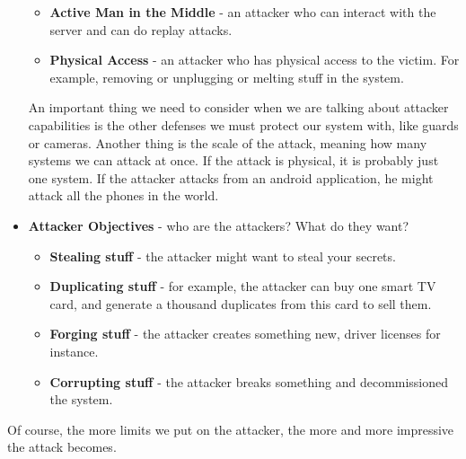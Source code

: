 \begin{itemize}
\begin{itemize}
            \item \textbf{Active Man in the Middle} - an attacker who can
            interact with the server and can do replay attacks.
            \item \textbf{Physical Access} - an attacker who has physical access
            to the victim. For example, removing or unplugging or melting stuff
            in the system.
        \end{itemize}
        An important thing we need to consider when we are talking about
        attacker capabilities is the other defenses we must protect our system with, like
 guards or cameras. Another thing is the scale of the attack, meaning how many systems we can attack at once. If the attack is physical, it is probably just one system. If the attacker attacks from an android application, he might attack all the phones in the world.
    \item \textbf{Attacker Objectives} - who are the attackers? What do they
    want?
        \begin{itemize}
            \item \textbf{Stealing stuff} - the attacker might want to steal
            your secrets.
            \item \textbf{Duplicating stuff} - for example, the attacker can buy
            one smart TV card, and generate a thousand duplicates from this card
            to sell them. 
            \item \textbf{Forging stuff} - the attacker creates something new,
            driver licenses for instance.
            \item \textbf{Corrupting stuff} - the attacker breaks something and
            decommissioned the system.
        \end{itemize}
\end{itemize}

Of course, the more limits we put on the attacker, the more and more
impressive the attack becomes.

